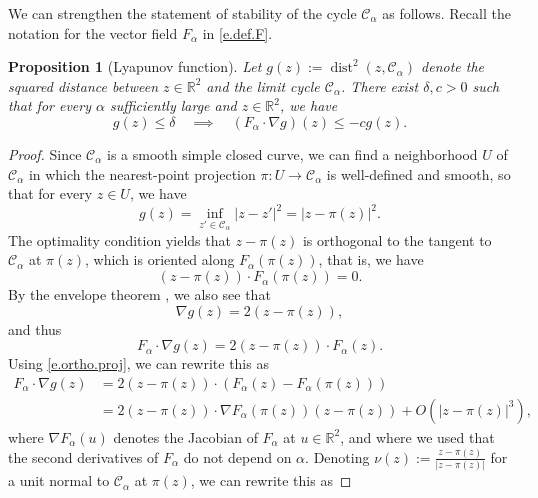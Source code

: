 \documentclass[11pt]{amsart}
\newtheorem{proposition}{Proposition}
\theoremstyle{remark}
\theoremstyle{definition}
\numberwithin{equation}{section}
\numberwithin{proposition}{section}
\newcommand{\R}{\mathbb{R}}
\renewcommand{\le}{\leqslant}
\newcommand{\Ll}{\left}
\newcommand{\Rr}{\right}
\newcommand{\1}{\mathbf{1}}
\newcommand{\msc}{\mathscr}
\newcommand{\al}{\alpha}
\newcommand{\de}{\delta}
\DeclareMathOperator{\dist}{dist}
\begin{document}
We can strengthen the statement of stability of the cycle $\msc C_\al$ as follows. Recall the notation for the vector field $F_\al$ in \eqref{e.def.F}. 
\begin{proposition}[Lyapunov function]
\label{p.lyapunov}
Let $g(z) := \dist^2(z,\msc C_\al)$ denote the squared distance between $z \in \R^2$ and the limit cycle $\msc C_\al$. There exist $\delta, c > 0$ such that for every $\al$ sufficiently large and $z \in \R^2$, we have
\begin{equation*}  %
g(z) \le \de  \quad \implies \quad (F_\al \cdot \nabla g)(z) \le -c  g(z).
\end{equation*}
\end{proposition}
\begin{proof}
Since $\msc C_\al$ is a smooth simple closed curve, we can find a neighborhood $U$ of $\msc C_\al$ in which the nearest-point projection
$\pi : U \to \msc C_\al$ is well-defined and smooth, so that for every $z \in U$, we have
\begin{equation*}  %
g(z) = \inf_{z' \in \msc C_\al} |z-z'|^2 = |z - \pi(z)|^2.
\end{equation*} 
The optimality condition yields that $z-\pi(z)$ is orthogonal to the tangent to~$\msc C_\al$ at $\pi(z)$, which is oriented along $F_\al(\pi(z))$, that is, we have 
\begin{equation}
\label{e.ortho.proj}
(z-\pi(z)) \cdot F_\al(\pi(z)) = 0.
\end{equation}
By the envelope theorem \cite[Theorem~2.21]{HJbook}, we also see that 
\begin{equation}\label{e.gradg}
\nabla g(z) = 2\Ll(z - \pi(z)\Rr),
\end{equation}
and thus
\begin{equation*}  %
F_\al \cdot \nabla g(z) = 2\Ll(z - \pi(z)\Rr) \cdot F_\al(z).
\end{equation*}
Using \eqref{e.ortho.proj}, we can rewrite this as
\begin{align*}  %
F_\al \cdot \nabla g(z)  
& = 2\Ll(z - \pi(z)\Rr) \cdot \Ll(F_\al(z) - F_\al(\pi(z))\Rr) \\
& = 2\Ll(z - \pi(z)\Rr) \cdot \nabla F_\al(\pi(z))\Ll(z - \pi(z)\Rr) + O\Ll(|z - \pi(z)|^3\Rr),
\end{align*}
where $\nabla F_\al(u)$ denotes the Jacobian of $F_\al$ at $u \in \R^2$, and where we used that the second derivatives of $F_\al$ do not depend on $\al$. Denoting $\nu(z) := \frac{z - \pi(z)}{|z - \pi(z)|}$ for a unit normal to $\msc C_\al$ at $\pi(z)$, we can rewrite this as

\end{proof}
\end{document}
